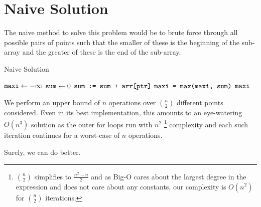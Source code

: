 
\section{Naive Solution}
The naive method to solve this problem would be to brute force through all possible pairs of points such that the smaller of these is the beginning of the sub-array and the greater of these is the end of the sub-array.

\begin{algorithm}
\caption{Naive Solution}\label{naive}
\begin{algorithmic}[1]
\State $\texttt{maxi} \gets -\infty$
        \State $\texttt{sum} \gets 0$
            \State $\texttt{sum := sum + arr[ptr]}$
        \State $\texttt{maxi = max(maxi, sum)}$
    \EndFor
\EndFor 
\State \Return $\texttt{maxi}$
\end{algorithmic}
\end{algorithm}

\noindent We perform an upper bound of $n$ operations over $\binom{n}{2}$ different points considered. Even in its best implementation, this amounts to an eye-watering $O(n^3)$ solution as the outer for loops run with $n^2$ \footnote{$\binom{n}{2}$ simplifies to $\frac{n^2-n}{2}$ and as Big-O cares about the largest degree in the expression and does not care about any constants, our complexity is $O(n^2)$ for $\binom{n}{2}$ iterations.} complexity and each such iteration continues for a worst-case of $n$ operations.  \newline

\noindent Surely, we can do better.

